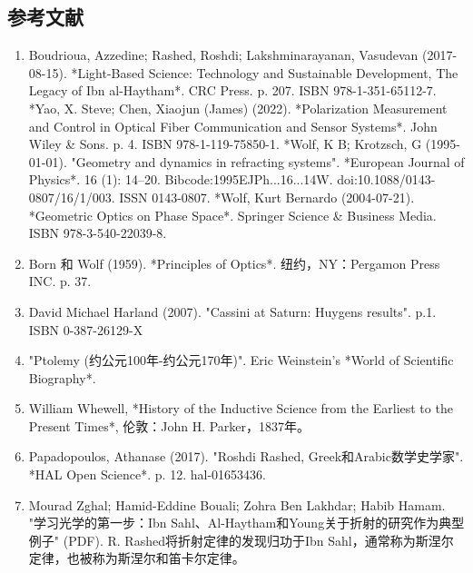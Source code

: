 \subsection{参考文献}  
\begin{enumerate}
\item Boudrioua, Azzedine; Rashed, Roshdi; Lakshminarayanan, Vasudevan (2017-08-15). *Light-Based Science: Technology and Sustainable Development, The Legacy of Ibn al-Haytham*. CRC Press. p. 207. ISBN 978-1-351-65112-7.  
*Yao, X. Steve; Chen, Xiaojun (James) (2022). *Polarization Measurement and Control in Optical Fiber Communication and Sensor Systems*. John Wiley & Sons. p. 4. ISBN 978-1-119-75850-1.  
*Wolf, K B; Krotzsch, G (1995-01-01). "Geometry and dynamics in refracting systems". *European Journal of Physics*. 16 (1): 14–20. Bibcode:1995EJPh...16...14W. doi:10.1088/0143-0807/16/1/003. ISSN 0143-0807.  
*Wolf, Kurt Bernardo (2004-07-21). *Geometric Optics on Phase Space*. Springer Science & Business Media. ISBN 978-3-540-22039-8. 
\item Born 和 Wolf (1959). *Principles of Optics*. 纽约，NY：Pergamon Press INC. p. 37.  
\item David Michael Harland (2007). "Cassini at Saturn: Huygens results". p.1. ISBN 0-387-26129-X  
\item "Ptolemy (约公元100年-约公元170年)". Eric Weinstein's *World of Scientific Biography*.  
\item William Whewell, *History of the Inductive Science from the Earliest to the Present Times*, 伦敦：John H. Parker，1837年。  
\item Papadopoulos, Athanase (2017). "Roshdi Rashed, Greek和Arabic数学史学家". *HAL Open Science*. p. 12. hal-01653436.  
\item Mourad Zghal; Hamid-Eddine Bouali; Zohra Ben Lakhdar; Habib Hamam. "学习光学的第一步：Ibn Sahl、Al-Haytham和Young关于折射的研究作为典型例子" (PDF). R. Rashed将折射定律的发现归功于Ibn Sahl，通常称为斯涅尔定律，也被称为斯涅尔和笛卡尔定律。


\end{enumerate}
